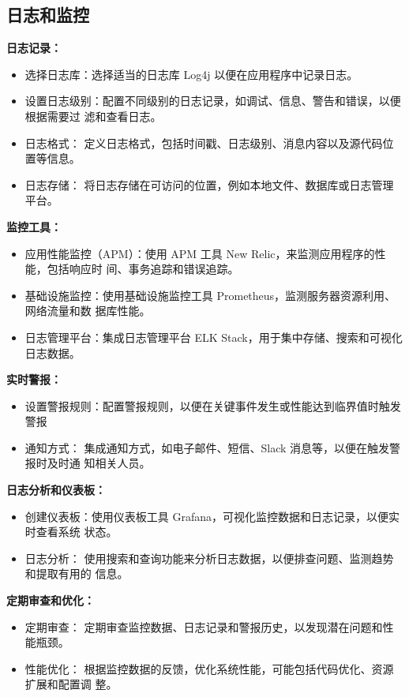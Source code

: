 \documentclass{article}
\begin{document}
\subsection{日志和监控}

\textbf{日志记录：}
\begin{itemize}
  \item 选择日志库：选择适当的日志库 Log4j 以便在应用程序中记录日志。
  \item 设置日志级别：配置不同级别的日志记录，如调试、信息、警告和错误，以便根据需要过
        滤和查看日志。
  \item 日志格式： 定义日志格式，包括时间戳、日志级别、消息内容以及源代码位置等信息。
  \item 日志存储： 将日志存储在可访问的位置，例如本地文件、数据库或日志管理平台。
\end{itemize}

\textbf{监控工具：}
\begin{itemize}
  \item 应用性能监控（APM）：使用 APM 工具 New Relic，来监测应用程序的性能，包括响应时
        间、事务追踪和错误追踪。
  \item 基础设施监控：使用基础设施监控工具 Prometheus，监测服务器资源利用、网络流量和数
        据库性能。
  \item 日志管理平台：集成日志管理平台 ELK Stack，用于集中存储、搜索和可视化日志数据。
\end{itemize}

\textbf{实时警报：}
\begin{itemize}
  \item 设置警报规则：配置警报规则，以便在关键事件发生或性能达到临界值时触发警报
  \item 通知方式： 集成通知方式，如电子邮件、短信、Slack 消息等，以便在触发警报时及时通
        知相关人员。
\end{itemize}

\textbf{日志分析和仪表板：}
\begin{itemize}
  \item 创建仪表板：使用仪表板工具 Grafana，可视化监控数据和日志记录，以便实时查看系统
        状态。
  \item 日志分析： 使用搜索和查询功能来分析日志数据，以便排查问题、监测趋势和提取有用的
        信息。
\end{itemize}

\textbf{定期审查和优化：}
\begin{itemize}
  \item 定期审查： 定期审查监控数据、日志记录和警报历史，以发现潜在问题和性能瓶颈。
  \item 性能优化： 根据监控数据的反馈，优化系统性能，可能包括代码优化、资源扩展和配置调
        整。
\end{itemize}
\end{document}
